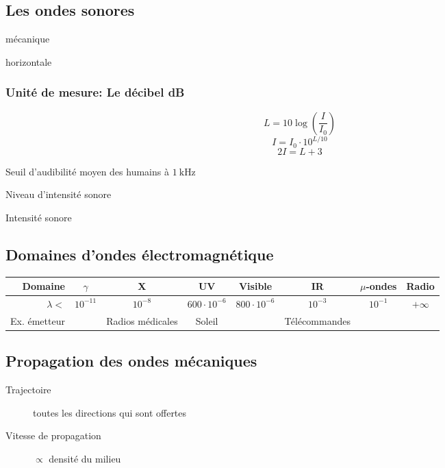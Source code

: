 \documentclass{article}
\newenvironment{definitions}{\begin{description}[leftmargin=!,labelwidth=\widthof{\bfseries Lorem ipsum dolor}]}{\end{description}}
\begin{document}
\subsection{Les ondes sonores}
\begin{definitions}
\item[Nature] mécanique
\item[Propagation] horizontale
\end{definitions}
\subsubsection{Unité de mesure: Le décibel dB}
$$L = 10 \log \left (\frac{I}{I_0} \right )$$
$$I = I_0 \cdot 10^{L / 10}$$
$$2I = L + 3$$

\begin{definitions}
\item[$I_0$] [$\SI{1E-12}{\watt\per\meter\squared}$] Seuil d'audibilité moyen des humains à $\SI{1}{\kilo\hertz}$
\item[$L$]   [dB] Niveau d'intensité sonore
\item[$I$]   [\si{\watt\per\meter\squared}] Intensité sonore
\end{definitions}

\subsection{Domaines d'ondes électromagnétique}

\begin{table}[h]
    \centering
    \begin{tabular}{r||c|c|c|c|c|c|c}
         Domaine & $\gamma$ & X & UV & Visible & IR & $\mu$-ondes & Radio \\\hline
         $\lambda < $ & $10^{-11}$ &  $10^{-8}$ & $600\cdot10^{-6}$  & $800\cdot10^{-6}$ & $10^{-3}$ & $10^{-1}$ & $+\infty$ \\
         Ex. émetteur & & Radios médicales & Soleil & & Télécommandes & & 
    \end{tabular}
\end{table}

\subsection{Propagation des ondes mécaniques}

\begin{description}
\item[Trajectoire] toutes les directions qui sont offertes
\item[Vitesse de propagation] $\propto$ densité du milieu
\end{description}
\end{document}
